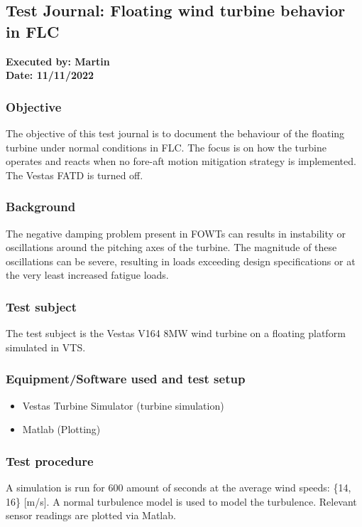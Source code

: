 \subsection{Test Journal: Floating wind turbine behavior in FLC} \label{app:tj_02}

\textbf{Executed by: Martin} \\
\textbf{Date: 11/11/2022}

\subsubsection{Objective}
The objective of this test journal is to document the behaviour of the floating turbine under normal conditions in FLC. The focus is on how the turbine operates and reacts when no fore-aft motion mitigation strategy is implemented. The Vestas FATD is turned off.

\subsubsection{Background}
The negative damping problem present in FOWTs can results in instability or oscillations around the pitching axes of the turbine. The magnitude of these oscillations can be severe, resulting in loads exceeding design specifications or at the very least increased fatigue loads.

\subsubsection{Test subject}
The test subject is the Vestas V164 8MW wind turbine on a floating platform simulated in VTS.

\subsubsection{Equipment/Software used and test setup}
\begin{itemize}
	\item Vestas Turbine Simulator (turbine simulation)
	\item Matlab (Plotting)
\end{itemize}

\subsubsection{Test procedure}
A simulation is run for 600 amount of seconds at the average wind speeds: \{14, 16\} [m/s]. A normal turbulence model is used to model the turbulence. Relevant sensor readings are plotted via Matlab.

